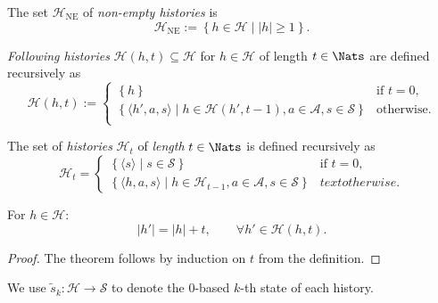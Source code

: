 \begin{definition} \label{def:hist-ne}
The set $\mathcal{H}_{\mathrm{NE}}$ of \emph{non-empty histories} is
\[
\mathcal{H}_{\mathrm{NE}} := \left\{ h \in \mathcal{H} \mid  |h| \ge 1 \right\}.
\]
\end{definition}

\begin{definition}\label{def:histories}
  \emph{Following histories} $\mathcal{H}(h,t) \subseteq \mathcal{H}$ for $h\in \mathcal{H}$ of length $t\in \Nats$ are defined recursively as
  \[
    \mathcal{H}(h,t) :=
    \begin{cases}
    \left\{  h \right\}  &\text{if } t = 0, \\
    \left\{  \langle h', a, s \rangle \mid h\in \mathcal{H}(h', t-1), a\in \mathcal{A}, s\in \mathcal{S}  \right\}  &\text{otherwise}. \\
    \end{cases}
  \]
\end{definition}

\begin{definition} \label{def:histories-horizon}
  The set of \emph{histories} $\mathcal{H}_{t}$ of \emph{length} $t \in \Nats$ is defined recursively as
  \[
    \mathcal{H}_t =
    \begin{cases}
      \left\{ \langle s \rangle \mid  s\in \mathcal{S} \right\} &\text{if } t = 0, \\
      \left\{ \langle h, a, s\rangle \mid h \in \mathcal{H}_{t-1}, a\in \mathcal{A}, s\in \mathcal{S} \right\} &text{otherwise}.
    \end{cases}
  \]
\end{definition}

\begin{theorem} \label{thm:hist-lenth-eq-horizon}
  For $h \in \mathcal{H}$:
  \[
   |h'| = |h| + t, \qquad \forall h'\in \mathcal{H}(h, t).
  \]
\end{theorem}
\begin{proof}
The theorem follows by induction on $t$ from the definition.  
\end{proof}

\begin{definition}
  We use $\tilde{s}_k\colon \mathcal{H} \to \mathcal{S}$ to denote the 0-based $k$-th state of each history.
\end{definition}

